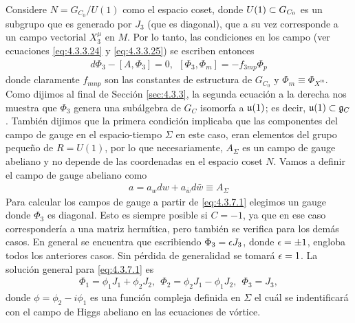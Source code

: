 Considere $N=G_{C_0}/U(1)$ como el espacio coset, donde $U(1)\subset G_{C_0}$ es un subgrupo que es generado por $J_3$ (que es diagonal), que a su vez corresponde a un campo vectorial $X^\mu_3$ en $M$. Por lo tanto, las condiciones en los campo (ver ecuaciones \eqref{eq:4.3.3.24} y \eqref{eq:4.3.3.25}) se escriben entonces
\begin{align}
	d\Phi_3-[A,\Phi_3] =0, \ \ [\Phi_3,\Phi_m]=-f_{3mp}\Phi_p \label{eq:4.3.7.1}
\end{align}
donde claramente $f_{mnp}$ son las constantes de estructura de $G_{C_0}$ y $\Phi_m\equiv \Phi_{X^m}$. Como dijimos al final de Sección \ref{sec:4.3.3}, la segunda ecuación a la derecha nos muestra que $\Phi_3$ genera una subálgebra de $G_C$ isomorfa a $\mathfrak{u}(1)$; es decir, $\mathfrak{u}(1)\subset\mathfrak{g}_C$. También dijimos que la primera condición implicaba que las componentes del campo de gauge en el espacio-tiempo $\Sigma$ en este caso, eran elementos del grupo pequeño de $R=U(1)$, por lo que necesariamente, $A_\Sigma$ es un campo de gauge abeliano y no depende de las coordenadas en el espacio coset $N$. Vamos a definir el campo de gauge abeliano como
\begin{align}
	a = a_w dw+a_{\bar w}d\bar w\equiv A_\Sigma
\end{align}
Para calcular los campos de gauge a partir de \eqref{eq:4.3.7.1} elegimos un gauge donde $\Phi_3$ es diagonal. Esto es siempre posible si $C=-1$, ya que en ese caso correspondería a una matriz hermítica, pero también se verifica para los demás casos. En general se encuentra que escribiendo $\Phi_3=\epsilon J_3$, donde $\epsilon=\pm 1$, engloba todos los anteriores casos. Sin pérdida de generalidad se tomará $\epsilon=1$. La solución general para \eqref{eq:4.3.7.1} es
\begin{align}
	\Phi_1 = \phi_1 J_1+\phi_2 J_2, \ \ \Phi_2 = \phi_2 J_1-\phi_1 J_2, \ \ \Phi_3 = J_3,
\end{align}
donde $\phi=\phi_2-i\phi_1$ es una función compleja definida en $\Sigma$ el cuál se indentificará con el campo de Higgs abeliano en las ecuaciones de vórtice.

